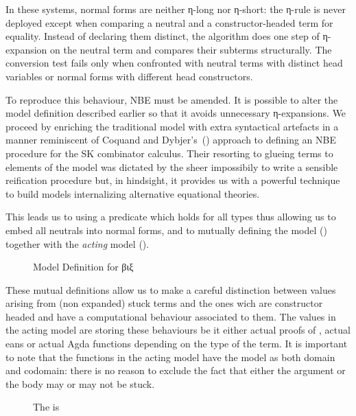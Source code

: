 In these systems, normal forms are neither η-long nor η-short: the η-rule is
never deployed except when comparing a neutral and a constructor-headed term
for equality. Instead of declaring
them distinct, the algorithm does one step of η-expansion on the
neutral term and compares their subterms structurally. The conversion test
fails only when confronted with neutral terms with distinct head
variables or normal forms with different head constructors.

To reproduce this behaviour, NBE must be amended.
It is possible to alter the model definition described earlier so that it
avoids unnecessary η-expansions. We proceed by enriching the traditional
model with extra syntactical artefacts in a manner reminiscent of Coquand
and Dybjer's~(\citeyear{CoqDybSK}) approach to defining an NBE procedure for the SK combinator calculus. Their resorting to glueing
terms to elements of the model was dictated by the sheer impossibily to write
a sensible reification procedure but, in hindsight, it provides us with a
powerful technique to build models internalizing alternative equational
theories.

This leads us to using a predicate  which holds for all types thus allowing
us to embed all neutrals into normal forms, and to  mutually defining the model
() together with the \emph{acting} model ().

\begin{figure}[h]
\caption{Model Definition for βιξ\label{nbestuckmodel}}
\end{figure}

These mutual definitions allow us to make a careful distinction between values
arising from (non expanded) stuck terms and the ones wich are constructor headed
and have a computational behaviour associated to them. The values in the acting
model are storing these behaviours be it either actual proofs of , actual
eans or actual Agda functions depending on the type of the term. It is
important to note that the functions in the acting model have the model as both
domain and codomain: there is no reason to exclude the fact that either the argument
or the body may or may not be stuck.

\begin{figure}[h]
\caption{The  is }
\end{figure}

